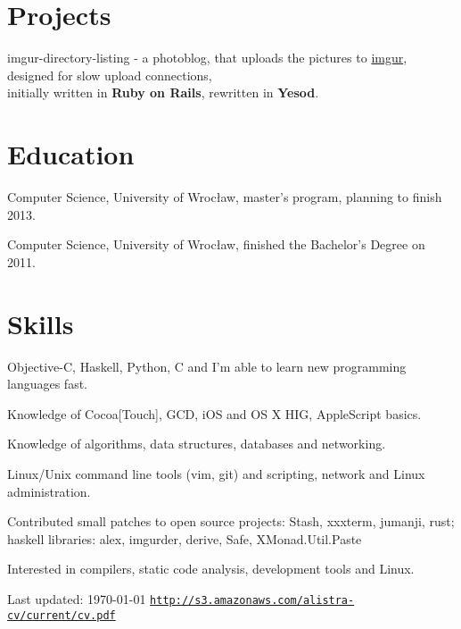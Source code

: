 \documentclass[letterpaper]{article}
\renewenvironment{itemize}{
  \begin{list}{}{
    \setlength{\leftmargin}{1.5em}
  }
}{
  \end{list}
}
\begin{document}
\section*{Projects}
\begin{itemize}
    \item imgur-directory-listing - a photoblog, that uploads the pictures to \href{http://imgur.com}{imgur},
        designed for slow upload connections,\\ initially written in {\bf Ruby on Rails}, rewritten in {\bf Yesod}.
\end{itemize}

\section*{Education}

\begin{itemize}
  	\item Computer Science, University of Wrocław, master's program, planning to finish 2013.
  	\item Computer Science, University of Wrocław, finished the Bachelor's Degree on 2011.
\end{itemize}

\section*{Skills}

\begin{itemize}
	\item Objective-C, Haskell, Python, C and I'm able to learn new programming languages fast.
	\item Knowledge of Cocoa[Touch], GCD, iOS and OS X HIG, AppleScript basics.
	\item Knowledge of algorithms, data structures, databases and networking.
    \item Linux/Unix command line tools (vim, git) and scripting, network and Linux administration.
	\item Contributed small patches to open source projects: Stash, xxxterm, jumanji, rust;\\
		 haskell libraries: alex, imgurder, derive, Safe, XMonad.Util.Paste
	\item Interested in compilers, static code analysis, development tools and Linux.
\end{itemize}

\bigskip

\begin{center}
  \begin{footnotesize}
    Last updated: \today
    \hfill
    \href{http://s3.amazonaws.com/alistra-cv/current/cv.pdf}
    {\texttt{http://s3.amazonaws.com/alistra-cv/current/cv.pdf}}
  \end{footnotesize}
\end{center}
\end{document}
